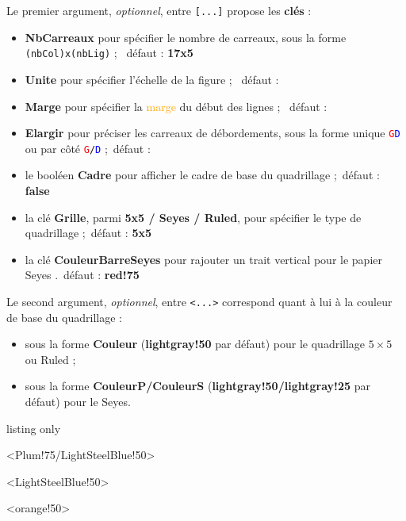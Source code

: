\documentclass[a4paper]{article}
\newcommand\Cle[1]{{\bfseries\sffamily\textlangle #1\textrangle}}
\begin{document}
Le premier argument, \textit{optionnel}, entre \texttt{[...]} propose les \Cle{clés} :

\begin{itemize}
	\item \Cle{NbCarreaux} pour spécifier le nombre de carreaux, sous la forme \texttt{(nbCol)x(nbLig)} ; \hfill~défaut : \Cle{17x5}
	\item \Cle{Unite} pour spécifier l'échelle de la figure ; \hfill~défaut : \Cle{1}
	\item \Cle{Marge} pour spécifier la \textcolor{orange}{marge} du début des lignes ; \hfill~défaut : \Cle{0}
	\item \Cle{Elargir} pour préciser les carreaux de débordements, sous la forme unique \texttt{\textcolor{red}{G}\textcolor{blue}{D}} ou par côté \texttt{\textcolor{red}{G}/\textcolor{blue}{D}} ;\hfill~défaut : \Cle{0}
	\item le booléen \Cle{Cadre} pour afficher le cadre de base du quadrillage ;\hfill~défaut : \Cle{false}
	\item la clé \Cle{Grille}, parmi \Cle{5x5 / Seyes / Ruled}, pour spécifier le type de quadrillage ;\hfill~défaut : \Cle{5x5}
	\item la clé \Cle{CouleurBarreSeyes} pour rajouter un trait vertical pour le papier Seyes .\hfill~défaut : \Cle{red!75}
\end{itemize}

Le second argument, \textit{optionnel}, entre \texttt{<...>} correspond quant à lui à la couleur de base du quadrillage :

\begin{itemize}
	\item sous la forme \Cle{Couleur} (\Cle{lightgray!50} par défaut) pour le quadrillage $5\times5$ ou Ruled ;
	\item sous la forme \Cle{CouleurP/CouleurS} (\Cle{lightgray!50/lightgray!25} par défaut) pour le Seyes.
\end{itemize}

\medskip

\begin{PresentationCode}{listing only}

\begin{EnvQuadrillage}[NbCarreaux=18x4,Grille=Seyes,Marge=3]<Plum!75/LightSteelBlue!50>
\end{EnvQuadrillage}

\begin{EnvQuadrillage}[NbCarreaux=36x8,Elargir=3/3]<LightSteelBlue!50>
\end{EnvQuadrillage}

\begin{center}
	\begin{EnvQuadrillage}[NbCarreaux=12x3,Elargir=2/2,Grille=Ruled,Marge=2]<orange!50>
	\end{EnvQuadrillage}
\end{center}
\end{PresentationCode}
\end{document}
